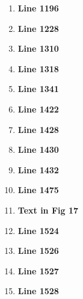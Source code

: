 \documentclass[aps,reprint,notitlepage,onecolumn,12pt]{revtex4-2}
\numberwithin{equation}{section}
\begin{document}
\begin{enumerate}
\begin{enumerate}
        \item \textbf{Line 1196}
        \item \textbf{Line 1228}
        \item \textbf{Line 1310}
        \item \textbf{Line 1318}
        \item \textbf{Line 1341}
        \item \textbf{Line 1422}
        \item \textbf{Line 1428}
        \item \textbf{Line 1430}
        \item \textbf{Line 1432}
        \item \textbf{Line 1475}
        \item \textbf{Text in Fig 17}
        \item \textbf{Line 1524}
        \item \textbf{Line 1526}
        \item \textbf{Line 1527}
        \item \textbf{Line 1528}
        
        
        
        
        
        
        
        
        

\end{enumerate}
\end{enumerate}
\end{document}
